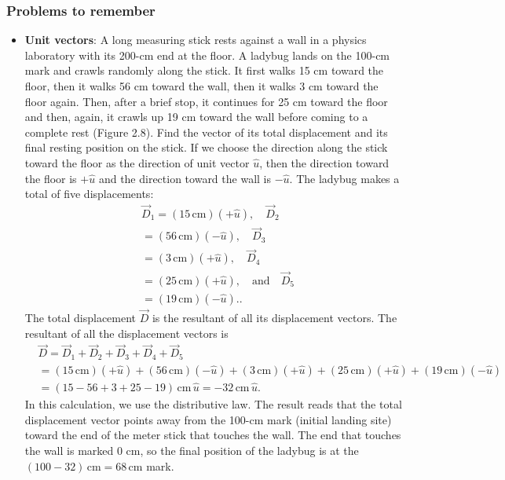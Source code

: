 \documentclass{report}
\begin{document}
    \subsubsection{Problems to remember}
    \begin{itemize}
        \item \textbf{Unit vectors}: A long measuring stick rests against a wall in a physics laboratory with its 200-cm end at the floor. A ladybug lands on the 100-cm mark and crawls randomly along the stick. It first walks 15 cm toward the floor, then it walks 56 cm toward the wall, then it walks 3 cm toward the floor again. Then, after a brief stop, it continues for 25 cm toward the floor and then, again, it crawls up 19 cm toward the wall before coming to a complete rest (Figure 2.8). Find the vector of its total displacement and its final resting position on the stick.
        \bigbreak \noindent 
        If we choose the direction along the stick toward the floor as the direction of unit vector $\hat{u}$, then the direction toward the floor is $+\hat{u}$ and the direction toward the wall is $-\hat{u}$. The ladybug makes a total of five displacements:
    \begin{align*}
        &\vec{D}_1 = (15\,\text{cm})(+\hat{u}), \quad \vec{D}_2  \\
        &= (56\,\text{cm})(-\hat{u}), \quad \vec{D}_3  \\
        &= (3\,\text{cm})(+\hat{u}), \quad \vec{D}_4  \\
        &= (25\,\text{cm})(+\hat{u}), \quad \text{and} \quad \vec{D}_5  \\
        &= (19\,\text{cm})(-\hat{u}).
    .\end{align*}
    The total displacement $\vec{D}$ is the resultant of all its displacement vectors.
    \bigbreak \noindent 
    The resultant of all the displacement vectors is
    \begin{align*}
        &\vec{D} = \vec{D}_1 + \vec{D}_2 + \vec{D}_3 + \vec{D}_4 + \vec{D}_5  \\
        &= (15\,\text{cm})(+\hat{u}) + (56\,\text{cm})(-\hat{u}) + (3\,\text{cm})(+\hat{u}) + (25\,\text{cm})(+\hat{u}) + (19\,\text{cm})(-\hat{u})  \\
        &= (15 - 56 + 3 + 25 - 19)\,\text{cm}\,\hat{u} = -32\,\text{cm}\,\hat{u}
    .\end{align*}
    In this calculation, we use the distributive law. The result reads that the total displacement vector points away from the 100-cm mark (initial landing site) toward the end of the meter stick that touches the wall. The end that touches the wall is marked 0 cm, so the final position of the ladybug is at the $(100 - 32)\,\text{cm} = 68\,\text{cm}$ mark.
    \end{itemize}
\end{document}
